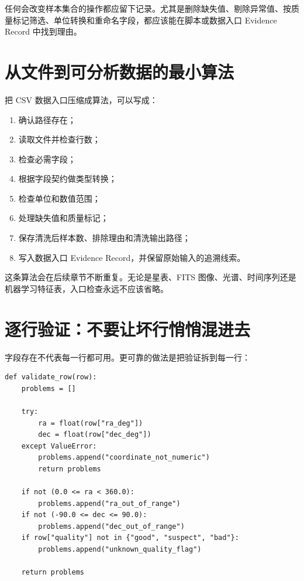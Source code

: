 \begin{warnbox}[清洗数据不是静默改文件]
任何会改变样本集合的操作都应留下记录。尤其是删除缺失值、剔除异常值、按质量标记筛选、单位转换和重命名字段，都应该能在脚本或数据入口 Evidence Record 中找到理由。
\end{warnbox}

\section{从文件到可分析数据的最小算法}

把 CSV 数据入口压缩成算法，可以写成：

\begin{enumerate}
    \item 确认路径存在；
    \item 读取文件并检查行数；
    \item 检查必需字段；
    \item 根据字段契约做类型转换；
    \item 检查单位和数值范围；
    \item 处理缺失值和质量标记；
    \item 保存清洗后样本数、排除理由和清洗输出路径；
    \item 写入数据入口 Evidence Record，并保留原始输入的追溯线索。
\end{enumerate}

这条算法会在后续章节不断重复。无论是星表、FITS 图像、光谱、时间序列还是机器学习特征表，入口检查永远不应该省略。

\section{逐行验证：不要让坏行悄悄混进去}

字段存在不代表每一行都可用。更可靠的做法是把验证拆到每一行：

\begin{examplebox}[逐行验证骨架]
\begin{lstlisting}[style=pythonstyle]
def validate_row(row):
    problems = []

    try:
        ra = float(row["ra_deg"])
        dec = float(row["dec_deg"])
    except ValueError:
        problems.append("coordinate_not_numeric")
        return problems

    if not (0.0 <= ra < 360.0):
        problems.append("ra_out_of_range")
    if not (-90.0 <= dec <= 90.0):
        problems.append("dec_out_of_range")
    if row["quality"] not in {"good", "suspect", "bad"}:
        problems.append("unknown_quality_flag")

    return problems
\end{lstlisting}
\end{examplebox}

